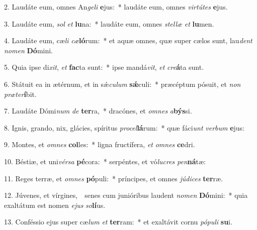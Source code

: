
2. Laudáte eum, omnes An\textit{ge}\textit{li} \textbf{e}jus:~* laudáte eum, omnes \textit{vir}\textit{tú}\textit{tes} \textbf{e}jus.

3. Laudáte eum, \textit{sol} \textit{et} \textbf{lu}na:~* laudáte eum, omnes \textit{stel}\textit{læ} \textit{et} \textbf{lu}men.

4. Laudáte eum, cæ\textit{li} \textit{cæ}\textbf{ló}rum:~* et aquæ omnes, quæ super cælos sunt, lau\textit{dent} \textit{no}\textit{men} \textbf{Dó}mini.

5. Quia ipse di\textit{xit}, \textit{et} \textbf{fac}ta sunt:~* ipse mandá\textit{vit}, \textit{et} \textit{cre}\textbf{á}ta sunt.

6. Státuit ea in ætérnum, et in s\'{\ae}\textit{cu}\textit{lum} \textbf{s\'{\ae}}culi:~* præcéptum pósuit, et \textit{non} \textit{præ}\textit{ter}\textbf{í}bit.

7. Laudáte Dómi\textit{num} \textit{de} \textbf{ter}ra,~* dracónes, et \textit{om}\textit{nes} \textit{a}\textbf{býs}si.

8. Ignis, grando, nix, glácies, spíritus \textit{pro}\textit{cel}\textbf{lá}rum:~* quæ fáci\textit{unt} \textit{ver}\textit{bum} \textbf{e}jus:

9. Montes, et \textit{om}\textit{nes} \textbf{col}les:~* ligna fructífera, \textit{et} \textit{om}\textit{nes} \textbf{ce}dri.

10. Béstiæ, et uni\textit{vér}\textit{sa} \textbf{pé}cora:~* serpéntes, et vó\textit{lu}\textit{cres} \textit{pen}\textbf{ná}tæ:

11. Reges terræ, et \textit{om}\textit{nes} \textbf{pó}puli:~* príncipes, et omnes \textit{jú}\textit{di}\textit{ces} \textbf{ter}ræ.

12. Júvenes, et vírgines,~\GreDagger\ senes cum junióribus laudent \textit{no}\textit{men} \textbf{Dó}mini:~* quia exaltátum est nomen \textit{e}\textit{jus} \textit{so}\textbf{lí}us.

13. Conféssio ejus super cæ\textit{lum} \textit{et} \textbf{ter}ram:~* et exaltávit cornu \textit{pó}\textit{pu}\textit{li} \textbf{su}i.

